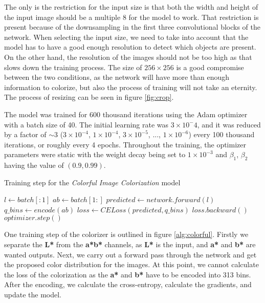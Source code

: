 The only is the restriction for the input size is that both the width and height
of the input image should be a multiple $8$ for the model to work. That restriction
is present because of the downsampling in the first three convolutional blocks of
the network. When selecting the input size, we need to take into account that the
model has to have a good enough resolution to detect which objects are present. On 
the other hand, the resolution of the images should not be too high as that slows 
down the training process. The size of $256\times256$ is a good compromise between
the two conditions, as the network will have more than enough information to colorize, 
but also the process of training will not take an eternity. The process of resizing 
can be seen in figure \ref{fig:crop}.

The model was trained for 600 thousand iterations using the Adam optimizer \citep{diederik2015adam}
with a batch size of 40. The initial learning rate was $3\times10^-4$, and it was
reduced by a factor of $\sim$3 ($3\times10^{-4}$, $1\times10^{-4}$, $3\times10^{-5}$,
..., $1\times10^{-6}$) every 100 thousand iterations, or roughly every 4 epochs. 
Throughout the training, the optimizer parameters were static with the weight decay
being set to $1\times10^{-3}$ and $\beta_1$, $\beta_2$ having the value of $(0.9, 0.99)$.

\begin{algorithm}[!ht]
	\caption{Training step for the \textit{Colorful Image Colorization} model}
	\label{alg:colorful}
	\begin{algorithmic}		
			\State $l \leftarrow batch[:1]$	
			\State $ab \leftarrow batch[1:]$
			\State $predicted \leftarrow network.forward(l)$	
			\State $q\_bins \leftarrow encode(ab)$
			\State $loss \leftarrow CELoss(predicted, q\_bins)$
			\State $loss.backward()$
			\State $optimizer.step()$
		\EndFunction
	\end{algorithmic}
\end{algorithm}

One training step of the colorizer is outlined in figure \ref{alg:colorful}. 
Firstly we separate the \textbf{L*} from the \textbf{a*b*} channels, as \textbf{L*}
is the input, and \textbf{a*} and \textbf{b*} are wanted outputs. Next, 
we carry out a forward pass through the network and get the proposed color 
distribution for the images. At this point, we cannot calculate the loss of the
colorization as the \textbf{a*} and \textbf{b*} have to be encoded into 313 bins.
After the encoding, we calculate the cross-entropy, calculate the gradients, and 
update the model.

